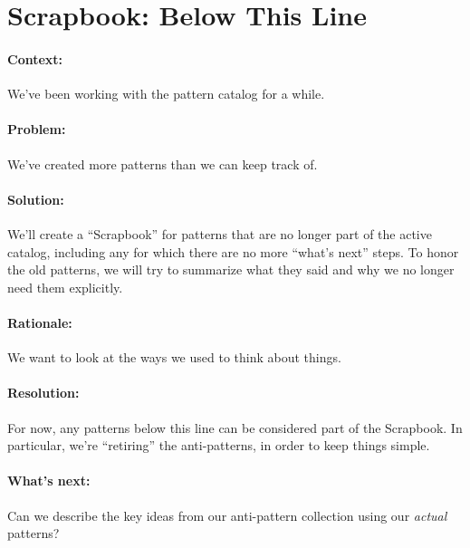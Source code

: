 \section{Scrapbook: Below This Line}

\paragraph{Context:} We've been working with the pattern catalog for a while.
\paragraph{Problem:} We've created more patterns than we can keep track of.
\paragraph{Solution:} We'll create a ``Scrapbook'' for patterns that are no longer part of the active catalog, including any for which there are no more ``what's next'' steps.   To honor the old patterns, we will try to summarize what they said and why we no longer need them explicitly.
\paragraph{Rationale:} We want to look at the ways we used to think about things.
\paragraph{Resolution:} For now, any patterns below this line can be considered part of the Scrapbook.  In particular, we're ``retiring'' the anti-patterns, in order to keep things simple.
\paragraph{What's next:} Can we describe the key ideas from our anti-pattern collection using our \emph{actual} patterns?

